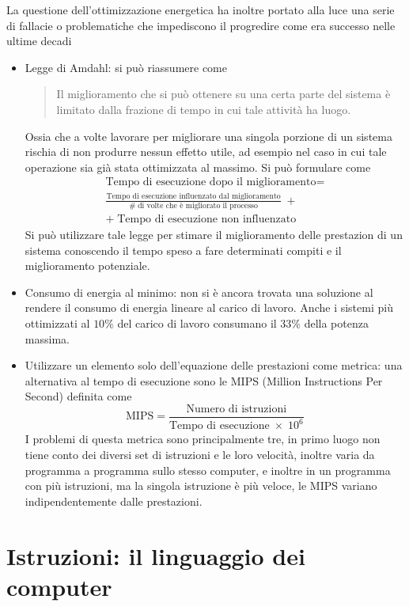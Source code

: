 \documentclass[a4paper,12pt]{article}
\theoremstyle{break}
\numberwithin{equation}{section}
\begin{document}
La questione dell'ottimizzazione energetica ha inoltre portato alla luce una serie di fallacie o problematiche che impediscono il progredire come era successo nelle ultime decadi
\begin{itemize}
    \item Legge di Amdahl: si può riassumere come \begin{quote}
        Il miglioramento che si può ottenere su una certa parte del sistema è limitato dalla frazione di tempo in cui tale attività ha luogo.
    \end{quote}
    Ossia che a volte lavorare per migliorare una singola porzione di un sistema rischia di non produrre nessun effetto utile, ad esempio nel caso in cui tale operazione sia già stata ottimizzata al massimo. Si può formulare come 
    \begin{align*}
        \mbox{Tempo di esecuzione dopo il miglioramento} = \\
        \frac{\mbox{Tempo di esecuzione influenzato dal miglioramento}}{\# \;\mbox{di volte che è migliorato il processo}} \; + \\
        + \; \mbox{Tempo di esecuzione non influenzato}
    \end{align*}
    Si può utilizzare tale legge per stimare il miglioramento delle prestazion di un sistema conoscendo il tempo speso a fare determinati compiti e il miglioramento potenziale.
    \item Consumo di energia al minimo: non si è ancora trovata una soluzione al rendere il consumo di energia lineare al carico di lavoro. Anche i sistemi più ottimizzati al \(10\%\) del carico di lavoro consumano il \(33\%\) della potenza massima.
    \item Utilizzare un elemento solo dell'equazione delle prestazioni come metrica: una alternativa al tempo di esecuzione sono le MIPS (Million Instructions Per Second) definita come 
    \[
        \mbox{MIPS} = \frac{\mbox{Numero di istruzioni}}{\mbox{Tempo di esecuzione} \; \times \; 10^6}
    \]
    I problemi di questa metrica sono principalmente tre, in primo luogo non tiene conto dei diversi set di istruzioni e le loro velocità, inoltre varia da programma a programma sullo stesso computer, e inoltre in un programma con più istruzioni, ma la singola istruzione è più veloce, le MIPS variano indipendentemente dalle prestazioni.
\end{itemize}
\newpage
\section{Istruzioni: il linguaggio dei computer}
\end{document}
